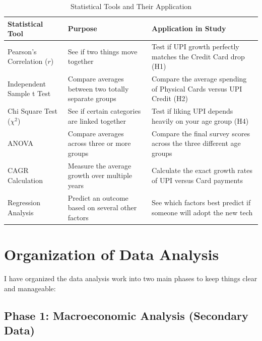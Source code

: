 \begin{table}[htbp]
    \centering
    \caption{Statistical Tools and Their Application}
    \vspace{0.3cm}
    \begin{tabular}{|p{4cm}|p{4cm}|p{5cm}|}
    \hline
    \textbf{Statistical Tool} & \textbf{Purpose} & \textbf{Application in Study} \\
    \hline
    Pearson's Correlation ($r$) & See if two things move together & Test if UPI growth perfectly matches the Credit Card drop (H1) \\
    \hline
    Independent Sample t Test & Compare averages between two totally separate groups & Compare the average spending of Physical Cards versus UPI Credit (H2) \\
    \hline
    Chi Square Test ($\chi^2$) & See if certain categories are linked together & Test if liking UPI depends heavily on your age group (H4) \\
    \hline
    ANOVA & Compare averages across three or more groups & Compare the final survey scores across the three different age groups \\
    \hline
    CAGR Calculation & Measure the average growth over multiple years & Calculate the exact growth rates of UPI versus Card payments \\
    \hline
    Regression Analysis & Predict an outcome based on several other factors & See which factors best predict if someone will adopt the new tech \\
    \hline
    \end{tabular}
    \label{tab:statistical_tools}
\end{table}

\section{Organization of Data Analysis}

I have organized the data analysis work into two main phases to keep things clear and manageable:

\subsection{Phase 1: Macroeconomic Analysis (Secondary Data)}

